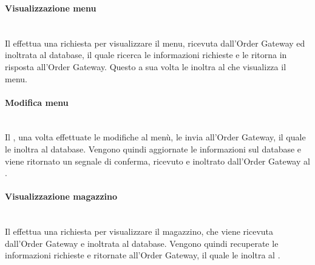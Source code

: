 \subsubsection{\Manager{}}

\paragraph{Visualizzazione menu}\mbox{}\\
Il \Manager{} effettua una richiesta per visualizzare il menu, ricevuta dall'Order Gateway ed inoltrata al database, il quale ricerca le informazioni richieste e le ritorna in risposta all'Order Gateway. Questo a sua volta le inoltra al \Manager{} che visualizza il menu.

\paragraph{Modifica menu}\mbox{}\\
Il \Manager{}, una volta effettuate le modifiche al menù, le invia all'Order Gateway, il quale le inoltra al database. Vengono quindi aggiornate le informazioni sul database e viene ritornato un segnale di conferma, ricevuto e inoltrato dall'Order Gateway al \Manager{}.

\paragraph{Visualizzazione magazzino}\mbox{}\\
Il \Manager{} effettua una richiesta per visualizzare il magazzino, che viene ricevuta dall'Order Gateway e inoltrata al database. Vengono quindi recuperate le informazioni richieste e ritornate all'Order Gateway, il quale le inoltra al \Manager{}.

